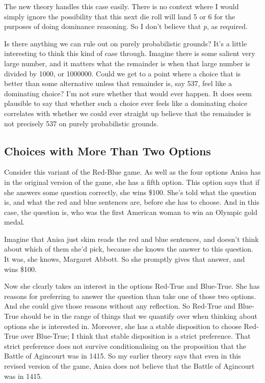 \documentclass[
  10pt,
  letterpaper,
  twoside]{scrbook}
\begin{document}
The new theory handles this case easily. There is no context where I
would simply ignore the possibility that this next die roll will land 5
or 6 for the purposes of doing dominance reasoning. So I don't believe
that \emph{p}, as required.

Is there anything we can rule out on purely probabilistic grounds? It's
a little interesting to think this kind of case through. Imagine there
is some salient very large number, and it matters what the remainder is
when that large number is divided by 1000, or 1000000. Could we get to a
point where a choice that is better than some alternative unless that
remainder is, say 537, feel like a dominating choice? I'm not sure
whether that would ever happen. It does seem plausible to say that
whether such a choice ever feels like a dominating choice correlates
with whether we could ever straight up believe that the remainder is not
precisely 537 on purely probabilistic grounds.

\subsection{Choices with More Than Two Options}\label{sec-threeway}

Consider this variant of the Red-Blue game. As well as the four options
Anisa has in the original version of the game, she has a fifth option.
This option says that if she answers some question correctly, she wins
\$100. She's told what the question is, and what the red and blue
sentences are, before she has to choose. And in this case, the question
is, who was the first American woman to win an Olympic gold medal.

Imagine that Anisa just skim reads the red and blue sentences, and
doesn't think about which of them she'd pick, because she knows the
answer to this question. It was, she knows, Margaret Abbott. So she
promptly gives that answer, and wins \$100.

Now she clearly takes an interest in the options Red-True and Blue-True.
She has reasons for preferring to answer the question than take one of
those two options. And she could give those reasons without any
reflection. So Red-True and Blue-True should be in the range of things
that we quantify over when thinking about options she is interested in.
Moreover, she has a stable disposition to choose Red-True over
Blue-True; I think that stable disposition is a strict preference. That
strict preference does not survive conditionalising on the proposition
that the Battle of Agincourt was in 1415. So my earlier theory says that
even in this revised version of the game, Anisa does not believe that
the Battle of Agincourt was in 1415.
\end{document}

